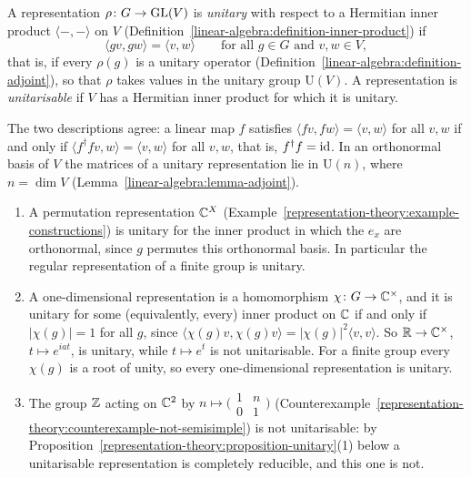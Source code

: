 \begin{definition}\label{representation-theory:definition-unitary}
A representation $\rho \colon G \to \mathrm{GL}(V)$ is \emph{unitary} with respect to a Hermitian inner product $\langle -, - \rangle$ on $V$ (Definition~\ref{linear-algebra:definition-inner-product}) if
\[
\langle gv, gw \rangle = \langle v, w \rangle \qquad \text{for all } g \in G \text{ and } v, w \in V,
\]
that is, if every $\rho(g)$ is a unitary operator (Definition~\ref{linear-algebra:definition-adjoint}), so that $\rho$ takes values in the unitary group $\mathrm{U}(V)$. A representation is
\emph{unitarisable} if $V$ has a Hermitian inner product for which it is unitary.
\end{definition}

The two descriptions agree: a linear map $f$ satisfies $\langle fv, fw\rangle = \langle v, w\rangle$ for all $v, w$ if and only if $\langle f^\dagger fv, w\rangle = \langle v, w\rangle$ for all
$v, w$, that is, $f^\dagger f = \mathrm{id}$. In an orthonormal basis of $V$ the matrices of a unitary representation lie in $\mathrm{U}(n)$, where $n = \dim V$
(Lemma~\ref{linear-algebra:lemma-adjoint}).

\begin{example}\label{representation-theory:example-unitary}
\begin{enumerate}
\item A permutation representation $\mathbb{C}^X$ (Example~\ref{representation-theory:example-constructions}) is unitary for the inner product in which the $e_x$ are orthonormal, since $g$ permutes
this orthonormal basis. In particular the regular representation of a finite group is unitary.
\item A one-dimensional representation is a homomorphism $\chi \colon G \to \mathbb{C}^\times$, and it is unitary for some (equivalently, every) inner product on $\mathbb{C}$ if and only if $|\chi(g)| = 1$
for all $g$, since $\langle \chi(g)v, \chi(g)v\rangle = |\chi(g)|^2\langle v, v\rangle$. So $\mathbb{R} \to \mathbb{C}^\times$, $t \mapsto e^{iat}$, is unitary, while $t \mapsto e^t$ is not unitarisable.
For a finite group every $\chi(g)$ is a root of unity, so every one-dimensional representation is unitary.
\item The group $\mathbb{Z}$ acting on $\mathbb{C}^2$ by $n \mapsto \bigl(\begin{smallmatrix}1 & n\\ 0 & 1\end{smallmatrix}\bigr)$ (Counterexample~\ref{representation-theory:counterexample-not-semisimple}) is
not unitarisable: by Proposition~\ref{representation-theory:proposition-unitary}(1) below a unitarisable representation is completely reducible, and this one is not.
\end{enumerate}
\end{example}

